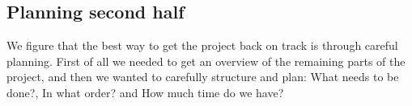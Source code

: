 \subsection{Planning second half}
We figure that the best way to get the project back on track is through careful planning. First of all we needed to get an overview of the remaining parts of the project, and then we wanted to carefully structure and plan: What needs to be done?, In what order? and How much time do we have?